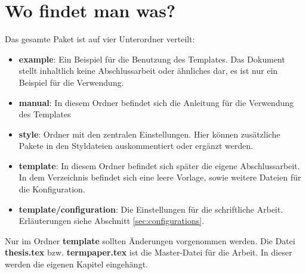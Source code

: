 %
\section{Wo findet man was?}\label{sec:wheretofindwhat}
Das gesamte Paket ist auf vier Unterordner verteilt:
\begin{itemize}
\item \textbf{example}: Ein Beispiel für die Benutzung des Templates. Das Dokument stellt inhaltlich keine Abschlussarbeit oder ähnliches dar, es ist nur ein Beispiel für die Verwendung.
\item \textbf{manual}: In diesem Ordner befindet sich die Anleitung für die Verwendung des Templates
\item \textbf{style}: Ordner mit den zentralen Einstellungen. Hier können zusätzliche Pakete in den Styldateien auskommentiert oder ergänzt werden.
\item \textbf{template}: In diesem Ordner befindet sich später die eigene Abschlussarbeit. In dem Verzeichnis befindet sich eine leere Vorlage, sowie weitere Dateien für die Konfiguration.
\item \textbf{template/configuration}: Die Einstellungen für die schriftliche Arbeit. Erläuterungen siehe Abschnitt \ref{sec:configurations}.
\end{itemize}

Nur im Ordner \textbf{template} sollten Änderungen vorgenommen werden. Die Datei \textbf{thesis.tex} bzw. \textbf{termpaper.tex} ist die Master-Datei für die Arbeit. In dieser werden die eigenen Kapitel eingehängt.
